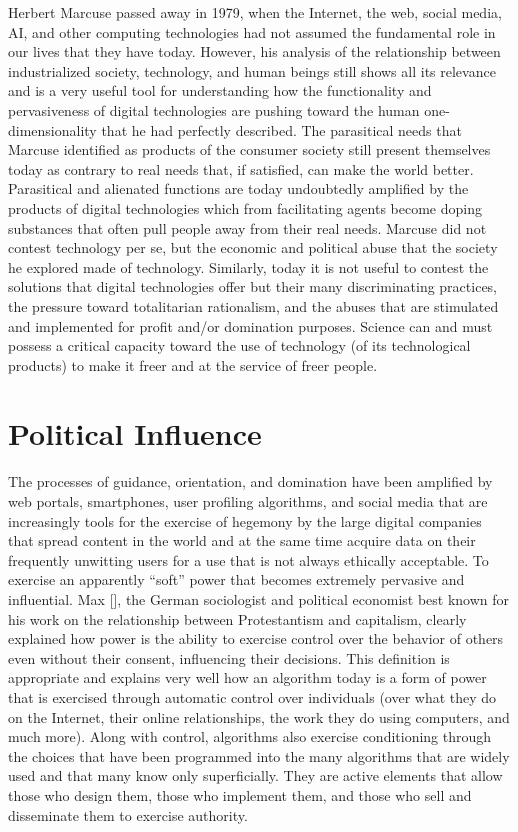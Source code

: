 Herbert Marcuse passed away in 1979, when the Internet, the web, social media, AI, and other computing technologies had not assumed the fundamental role in our lives that they have today. However, his analysis of the relationship between industrialized society, technology, and human beings still shows all its relevance and is a very useful tool for understanding how the functionality and pervasiveness of digital technologies are pushing toward the human one-dimensionality that he had perfectly described. The parasitical needs that Marcuse identified as products of the consumer society still present themselves today as contrary to real needs that, if satisfied, can make the world better. Parasitical and alienated functions are today undoubtedly amplified by the products of digital technologies which from facilitating agents become doping substances that often pull people away from their real needs. Marcuse did not contest technology per se, but the economic and political abuse that the society he explored made of technology. Similarly, today it is not useful to contest the solutions that digital technologies offer but their many discriminating practices, the pressure toward totalitarian rationalism, and the abuses that are stimulated and implemented for profit and/or domination purposes. Science can and must possess a critical capacity toward the use of technology (of its technological products) to make it freer and at the service of freer people.

\section{\label{sec:8.5}Political Influence}

The processes of guidance, orientation, and domination have been amplified by web portals, smartphones, user profiling algorithms, and social media that are increasingly tools for the exercise of hegemony by the large digital companies that spread content in the world and at the same time acquire data on their frequently unwitting users for a use that is not always ethically acceptable. To exercise an apparently ``soft'' power that becomes extremely pervasive and influential. Max \citeauthor{chap:8:Weber:2019} [\citeyear{chap:8:Weber:2019}], the German sociologist and political economist best known for his work on the relationship between Protestantism and capitalism, clearly explained how power is the ability to exercise control over the behavior of others even without their consent, influencing their decisions. This definition is appropriate and explains very well how an algorithm today is a form of power that is exercised through automatic control over individuals (over what they do on the Internet, their online relationships, the work they do using computers, and much more). Along with control, algorithms also exercise conditioning through the choices that have been programmed into the many algorithms that are widely used and that many know only superficially. They are active elements that allow those who design them, those who implement them, and those who sell and disseminate them to exercise authority.

